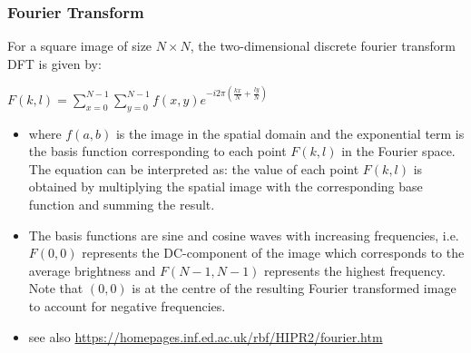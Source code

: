\begin{frame}
    \frametitle{Fourier Transform}
    For a square image of size $N \times N$, the two-dimensional discrete fourier transform DFT is given by: \newline

    \begin{center}
       $F(k,l) = \sum^{N-1}_{x=0} \sum^{N-1}_{y=0} f(x,y) e^{-i 2\pi(\frac{kx}{N}+\frac{ly}{N})}$
    \end{center}
    \begin{itemize}

    \item where $f(a,b)$ is the image in the spatial domain and the exponential term is the basis function corresponding to each point $F(k,l)$ in the Fourier space. The equation can be interpreted as: the value of each point $F(k,l)$ is obtained by multiplying the spatial image with the corresponding base function and summing the result.

    \item The basis functions are sine and cosine waves with increasing frequencies, i.e. $F(0,0)$ represents the DC-component of the image which corresponds to the average brightness and $F(N-1,N-1)$ represents the highest frequency. Note that $(0,0)$ is at the centre of the resulting Fourier transformed image to account for negative frequencies. 

    \item see also \url{https://homepages.inf.ed.ac.uk/rbf/HIPR2/fourier.htm}
    \end{itemize}

\end{frame}


